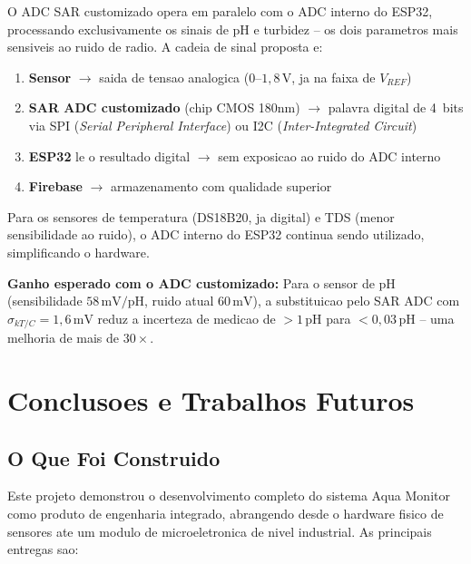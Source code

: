 \documentclass[12pt, a4paper]{article}
\begin{document}
O ADC SAR customizado opera em paralelo com o ADC interno do ESP32,
processando exclusivamente os sinais de pH e turbidez -- os dois parametros mais sensiveis
ao ruido de radio. A cadeia de sinal proposta e:

\begin{enumerate}
  \item \textbf{Sensor} $\to$ saida de tensao analogica ($0$--$1{,}8\,\text{V}$, ja na faixa de $V_{REF}$)
  \item \textbf{SAR ADC customizado} (chip CMOS 180nm) $\to$ palavra digital de 4~bits via SPI
        (\textit{Serial Peripheral Interface}) ou I2C (\textit{Inter-Integrated Circuit})
  \item \textbf{ESP32} le o resultado digital $\to$ sem exposicao ao ruido do ADC interno
  \item \textbf{Firebase} $\to$ armazenamento com qualidade superior
\end{enumerate}

Para os sensores de temperatura (DS18B20, ja digital) e TDS (menor sensibilidade ao ruido),
o ADC interno do ESP32 continua sendo utilizado, simplificando o hardware.

\textbf{Ganho esperado com o ADC customizado:} Para o sensor de pH (sensibilidade $58\,\text{mV/pH}$,
ruido atual $60\,\text{mV}$), a substituicao pelo SAR ADC com $\sigma_{kT/C} = 1{,}6\,\text{mV}$
reduz a incerteza de medicao de $>1\,\text{pH}$ para $<0{,}03\,\text{pH}$ -- uma melhoria
de mais de $30\times$.

\section{Conclusoes e Trabalhos Futuros}

\subsection{O Que Foi Construido}

Este projeto demonstrou o desenvolvimento completo do sistema Aqua Monitor como produto
de engenharia integrado, abrangendo desde o hardware fisico de sensores ate um modulo de
microeletronica de nivel industrial. As principais entregas sao:
\end{document}
